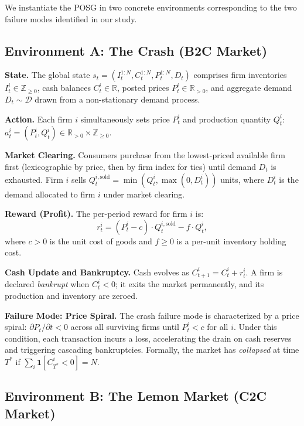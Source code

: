 We instantiate the POSG in two concrete environments corresponding to the two failure modes identified in our study.

\subsection{Environment A: The Crash (B2C Market)}
\label{setup:crash}

\textbf{State.} The global state $s_t = (I_t^{1:N}, C_t^{1:N}, P_t^{1:N}, D_t)$ comprises firm inventories $I_t^i \in \mathbb{Z}_{\geq 0}$, cash balances $C_t^i \in \mathbb{R}$, posted prices $P_t^i \in \mathbb{R}_{>0}$, and aggregate demand $D_t \sim \mathcal{D}$ drawn from a non-stationary demand process.

\textbf{Action.} Each firm $i$ simultaneously sets price $P_t^i$ and production quantity $Q_t^i$:
$a_t^i = (P_t^i, Q_t^i) \in \mathbb{R}_{>0} \times \mathbb{Z}_{\geq 0}$.

\textbf{Market Clearing.} Consumers purchase from the lowest-priced available firm first (lexicographic by price, then by firm index for ties) until demand $D_t$ is exhausted. Firm $i$ sells $Q_t^{i,\text{sold}} = \min(Q_t^i, \max(0, D_t^i))$ units, where $D_t^i$ is the demand allocated to firm $i$ under market clearing.

\textbf{Reward (Profit).} The per-period reward for firm $i$ is:
\begin{equation}
    r_t^i = (P_t^i - c) \cdot Q_t^{i,\text{sold}} - f \cdot Q_t^i,
\end{equation}
where $c > 0$ is the unit cost of goods and $f \geq 0$ is a per-unit inventory holding cost.

\textbf{Cash Update and Bankruptcy.} Cash evolves as $C_{t+1}^i = C_t^i + r_t^i$. A firm is declared \textit{bankrupt} when $C_t^i < 0$; it exits the market permanently, and its production and inventory are zeroed.

\textbf{Failure Mode: Price Spiral.}
The crash failure mode is characterized by a price spiral: $\partial P_t / \partial t < 0$ across all surviving firms until $P_t^i < c$ for all $i$. Under this condition, each transaction incurs a loss, accelerating the drain on cash reserves and triggering cascading bankruptcies. Formally, the market has \textit{collapsed} at time $T^*$ if $\sum_i \mathbf{1}[C_{T^*}^i < 0] = N$.

\subsection{Environment B: The Lemon Market (C2C Market)}
\label{setup:lemon}

